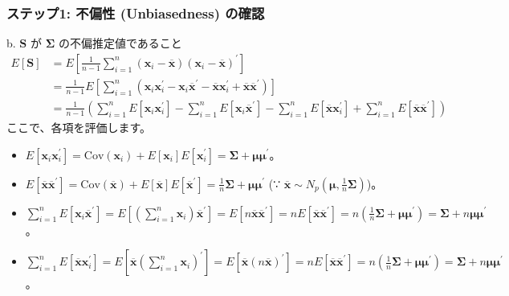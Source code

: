 \documentclass[aspectratio=169]{beamer}
\begin{document}
\begin{frame}
\frametitle{ステップ1: 不偏性 (Unbiasedness) の確認}
\begin{block}{b. $\bm{S}$ が $\bm{\Sigma}$ の不偏推定値であること}
\begin{align*}
E[\bm{S}] &= E\left[\frac{1}{n-1}\sum_{i=1}^{n}(\bm{x}_i-\overline{\bm{x}})(\bm{x}_i-\overline{\bm{x}})^{\prime}\right] \\
&= \frac{1}{n-1}E\left[\sum_{i=1}^{n}(\bm{x}_i\bm{x}_i^{\prime}-\bm{x}_i\overline{\bm{x}}^{\prime}-\overline{\bm{x}}\bm{x}_i^{\prime}+\overline{\bm{x}}\overline{\bm{x}}^{\prime})\right] \\
&= \frac{1}{n-1}\left(\sum_{i=1}^{n}E[\bm{x}_i\bm{x}_i^{\prime}]-\sum_{i=1}^{n}E[\bm{x}_i\overline{\bm{x}}^{\prime}]-\sum_{i=1}^{n}E[\overline{\bm{x}}\bm{x}_i^{\prime}]+\sum_{i=1}^{n}E[\overline{\bm{x}}\overline{\bm{x}}^{\prime}]\right)
\end{align*}
ここで、各項を評価します。
\begin{itemize}
    \item $E[\bm{x}_i\bm{x}_i^{\prime}]=\text{Cov}(\bm{x}_i)+E[\bm{x}_i]E[\bm{x}_i^{\prime}]=\bm{\Sigma}+\bm{\mu}\bm{\mu}^{\prime}$。
    \item $E[\overline{\bm{x}}\overline{\bm{x}}^{\prime}]=\text{Cov}(\overline{\bm{x}})+E[\overline{\bm{x}}]E[\overline{\bm{x}}^{\prime}]=\frac{1}{n}\bm{\Sigma}+\bm{\mu}\bm{\mu}^{\prime}$ (∵ $\overline{\bm{x}}\sim N_p(\bm{\mu},\frac{1}{n}\bm{\Sigma})$)。
    \item $\sum_{i=1}^{n}E[\bm{x}_i\overline{\bm{x}}^{\prime}]=E[(\sum_{i=1}^{n}\bm{x}_i)\overline{\bm{x}}^{\prime}]=E[n\overline{\bm{x}}\overline{\bm{x}}^{\prime}]=nE[\overline{\bm{x}}\overline{\bm{x}}^{\prime}]=n(\frac{1}{n}\bm{\Sigma}+\bm{\mu}\bm{\mu}^{\prime})=\bm{\Sigma}+n\bm{\mu}\bm{\mu}^{\prime}$。
    \item $\sum_{i=1}^{n}E[\overline{\bm{x}}\bm{x}_i^{\prime}]=E[\overline{\bm{x}}(\sum_{i=1}^{n}\bm{x}_i)^{\prime}]=E[\overline{\bm{x}}(n\overline{\bm{x}})^{\prime}]=nE[\overline{\bm{x}}\overline{\bm{x}}^{\prime}]=n(\frac{1}{n}\bm{\Sigma}+\bm{\mu}\bm{\mu}^{\prime})=\bm{\Sigma}+n\bm{\mu}\bm{\mu}^{\prime}$。
\end{itemize}
\end{block}
\end{frame}
\end{document}
